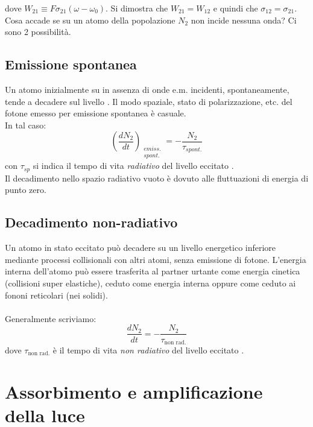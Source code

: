 dove $W_{21} \equiv F \sigma_{21}(\omega - \omega_0)$.
Si dimostra che $W_{21} = W_{12}$ e quindi che $\sigma_{12} = \sigma_{21}$.\\

Cosa accade se su un atomo della popolazione $N_2$ non incide nessuna onda? Ci sono 2 possibilità.

\subsection{Emissione spontanea}

Un atomo inizialmente su  in assenza di onde e.m. incidenti, spontaneamente, tende a decadere sul livello . Il modo spaziale, stato di polarizzazione, etc. del fotone emesso per emissione spontanea è casuale.\\
In tal caso:
\begin{equation*}
\left( \frac{dN_2}{dt} \right)_{\substack{emiss.\\ spont.}} = -\frac{N_2}{\tau_{spont.}}
\end{equation*}
con $\tau_{sp}$ si indica il tempo di vita \textit{radiativo} del livello eccitato .\\
Il decadimento nello spazio radiativo vuoto è dovuto alle fluttuazioni di energia di punto zero.

\subsection{Decadimento non-radiativo}

Un atomo in stato eccitato può decadere su un livello energetico inferiore mediante processi collisionali con altri atomi, senza emissione di fotone. L'energia interna dell'atomo può essere trasferita al partner urtante come energia cinetica (collisioni super elastiche), ceduto come energia interna oppure come ceduto ai fononi reticolari (nei solidi).\\
\\
Generalmente scriviamo:
\begin{equation*}
    \frac{dN_2}{dt} = - \frac{N_2}{\tau_{\text{non rad.}}}
\end{equation*}
dove $\tau_{\text{non rad.}}$ è il tempo di vita \textit{non radiativo} del livello eccitato .

\section{Assorbimento e amplificazione della luce}

